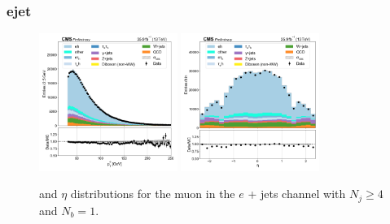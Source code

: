 
\subsubsection{ejet}


\begin{figure}[htb!]
    \centering
    \includegraphics[width=0.4\textwidth]{chapters/Analysis/sectionPlots/figures/data_mc_overlays/ejet_2016_cat_gt4_eq1_signal_linear_lepton_lepton1_pt}
    \includegraphics[width=0.4\textwidth]{chapters/Analysis/sectionPlots/figures/data_mc_overlays/ejet_2016_cat_gt4_eq1_signal_linear_lepton_lepton1_eta}
    \caption{\pt and $\eta$ distributions for the muon in the $e$ + jets
    channel with $N_{j} \geq 4$ and $N_{b} = 1$.
    \label{fig:analysis:plots:ejet_1_kinematic}}
\end{figure}

